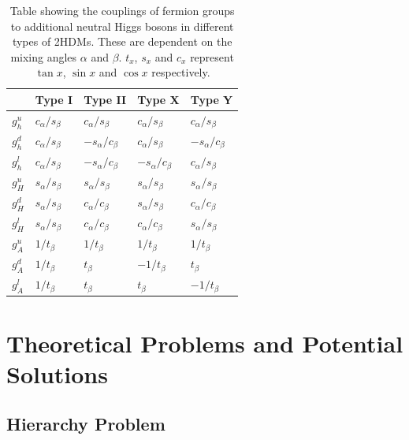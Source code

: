 \begin{table}[H]
    \centering
    \begin{tabular}{|x{1.0cm}|x{2.0cm}x{2.0cm}x{2.0cm}x{2.0cm}|}
    		\hline
    	 	& Type I & Type II & Type X & Type Y \\
    	 	\hline
    	 	\hline
    	 	$g_{h}^{u}$ & $c_{\alpha}/s_{\beta}$ & $c_{\alpha}/s_{\beta}$  & $c_{\alpha}/s_{\beta}$  & $c_{\alpha}/s_{\beta}$  \\ 
    	 	$g_{h}^{d}$ & $c_{\alpha}/s_{\beta}$ & $-s_{\alpha}/c_{\beta}$ & $c_{\alpha}/s_{\beta}$  & $-s_{\alpha}/c_{\beta}$ \\
    	 	$g_{h}^{l}$ & $c_{\alpha}/s_{\beta}$ & $-s_{\alpha}/c_{\beta}$ & $-s_{\alpha}/c_{\beta}$ & $c_{\alpha}/s_{\beta}$  \\
    	 	\hline
    	 	$g_{H}^{u}$ & $s_{\alpha}/s_{\beta}$ & $s_{\alpha}/s_{\beta}$ & $s_{\alpha}/s_{\beta}$ & $s_{\alpha}/s_{\beta}$ \\
    	 	$g_{H}^{d}$ & $s_{\alpha}/s_{\beta}$ & $c_{\alpha}/c_{\beta}$ & $s_{\alpha}/s_{\beta}$ & $c_{\alpha}/c_{\beta}$ \\
    	 	$g_{H}^{l}$ & $s_{\alpha}/s_{\beta}$ & $c_{\alpha}/c_{\beta}$ & $c_{\alpha}/c_{\beta}$ & $s_{\alpha}/s_{\beta}$ \\
    	 	\hline
    	 	$g_{A}^{u}$ & $1/t_{\beta}$ & $1/t_{\beta}$ & $1/t_{\beta}$  & $1/t_{\beta}$ \\
    	 	$g_{A}^{d}$ & $1/t_{\beta}$ & $t_{\beta}$   & $-1/t_{\beta}$ & $t_{\beta}$ \\
    	 	$g_{A}^{l}$ & $1/t_{\beta}$ & $t_{\beta}$   & $t_{\beta}$    & $-1/t_{\beta}$ \\
        \hline
    \end{tabular}
    \caption{Table showing the couplings of fermion groups to additional neutral Higgs bosons in different types of 2HDMs. These are dependent on the mixing angles $\alpha$ and $\beta$. $t_{x}$, $s_{x}$ and $c_{x}$ represent $\tan x$, $\sin x$ and $\cos x$ respectively.}
    \label{tab:2hdm_couplings}
\end{table}



\section{Theoretical Problems and Potential Solutions}

\subsection{Hierarchy Problem}

